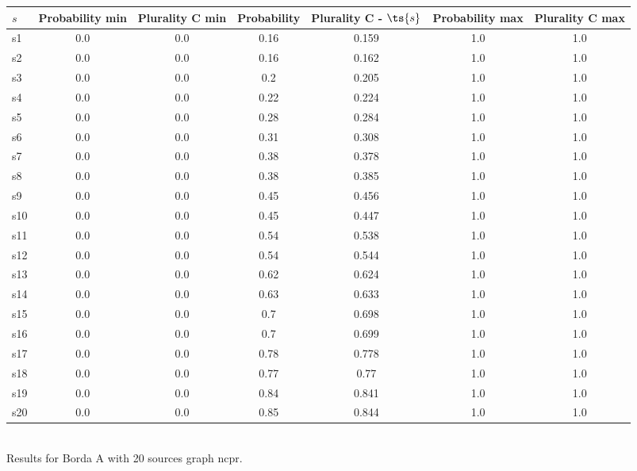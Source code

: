 \documentclass{article}
\begin{document}
\noindent\begin{tabular}{|l|c|c|c|c|c|c|}
\hline
$s$& Probability min & Plurality C min & Probability & Plurality C - $\ts{s}$ & Probability max & Plurality C max\\
\hline
s1 &0.0 & 0.0 & 0.16 & 0.159 & 1.0 & 1.0\\
\hline
s2 &0.0 & 0.0 & 0.16 & 0.162 & 1.0 & 1.0\\
\hline
s3 &0.0 & 0.0 & 0.2 & 0.205 & 1.0 & 1.0\\
\hline
s4 &0.0 & 0.0 & 0.22 & 0.224 & 1.0 & 1.0\\
\hline
s5 &0.0 & 0.0 & 0.28 & 0.284 & 1.0 & 1.0\\
\hline
s6 &0.0 & 0.0 & 0.31 & 0.308 & 1.0 & 1.0\\
\hline
s7 &0.0 & 0.0 & 0.38 & 0.378 & 1.0 & 1.0\\
\hline
s8 &0.0 & 0.0 & 0.38 & 0.385 & 1.0 & 1.0\\
\hline
s9 &0.0 & 0.0 & 0.45 & 0.456 & 1.0 & 1.0\\
\hline
s10 &0.0 & 0.0 & 0.45 & 0.447 & 1.0 & 1.0\\
\hline
s11 &0.0 & 0.0 & 0.54 & 0.538 & 1.0 & 1.0\\
\hline
s12 &0.0 & 0.0 & 0.54 & 0.544 & 1.0 & 1.0\\
\hline
s13 &0.0 & 0.0 & 0.62 & 0.624 & 1.0 & 1.0\\
\hline
s14 &0.0 & 0.0 & 0.63 & 0.633 & 1.0 & 1.0\\
\hline
s15 &0.0 & 0.0 & 0.7 & 0.698 & 1.0 & 1.0\\
\hline
s16 &0.0 & 0.0 & 0.7 & 0.699 & 1.0 & 1.0\\
\hline
s17 &0.0 & 0.0 & 0.78 & 0.778 & 1.0 & 1.0\\
\hline
s18 &0.0 & 0.0 & 0.77 & 0.77 & 1.0 & 1.0\\
\hline
s19 &0.0 & 0.0 & 0.84 & 0.841 & 1.0 & 1.0\\
\hline
s20 &0.0 & 0.0 & 0.85 & 0.844 & 1.0 & 1.0\\
\hline
\end{tabular}\\

\noindent Results for Borda A with 20 sources graph ncpr.
\end{document}
